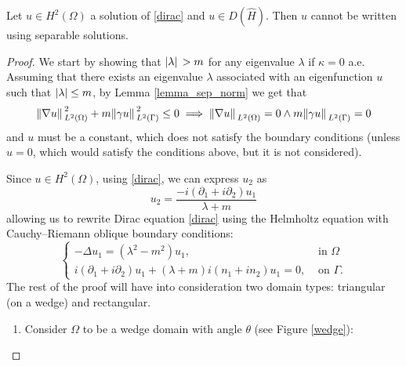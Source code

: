 \begin{proposition}\label{dirac_not_polar}
    Let \(u \in H^2(\Omega)\) a solution of \eqref{dirac} and \(u \in D(\hat{H})\). Then \(u\) cannot be written using separable solutions.
\end{proposition}
\begin{proof}
    We start by showing that \(\abs*{\lambda}>m\) for any eigenvalue \(\lambda\) if \(\kappa = 0\) a.e. Assuming that there exists an eigenvalue \(\lambda\) associated with an eigenfunction \(u\) such that \(\abs{\lambda} \leq m\), by Lemma \ref{lemma_sep_norm} we get that 
    \[
    \norm*{\nabla u }_{L^2(\Omega)}^2 + m \norm*{\gamma u}_{L^2(\Gamma)}^2 \leq 0 \implies \norm*{\nabla u }_{L^2(\Omega)} = 0 \land m \norm*{\gamma u}_{L^2(\Gamma)} = 0
    \]
    and \(u\) must be a constant, which does not satisfy the boundary conditions (unless \(u=0\), which would satisfy the conditions above, but it is not considered).

    Since \(u \in H^2(\Omega)\), using \eqref{dirac}, we can express \(u_2\) as
    \[
    u_2 = \frac{-i (\partial_1 + i\partial_2)u_1}{\lambda + m}    
    \]
    allowing us to rewrite Dirac equation \eqref{dirac} using the Helmholtz equation with Cauchy–Riemann oblique boundary conditions:
    \begin{equation}\label{helm_system}
        \begin{cases}
            -\Delta u_1 = (\lambda^2 - m^2)u_1, & \text{ in } \Omega\\
             i (\partial_1 + i\partial_2)u_1 + (\lambda + m)i(n_1 + i n_2)u_1 = 0, & \text{ on } \Gamma.
        \end{cases}      
    \end{equation}
    The rest of the proof will have into consideration two domain types: triangular (on a wedge) and rectangular.
    \begin{enumerate}

    \item Consider \(\Omega\) to be a wedge domain with angle \(\theta\) (see Figure \ref{wedge}):
    
    \begin{figure}[H]
    \centering
\end{figure}
\end{enumerate}
\end{proof}
